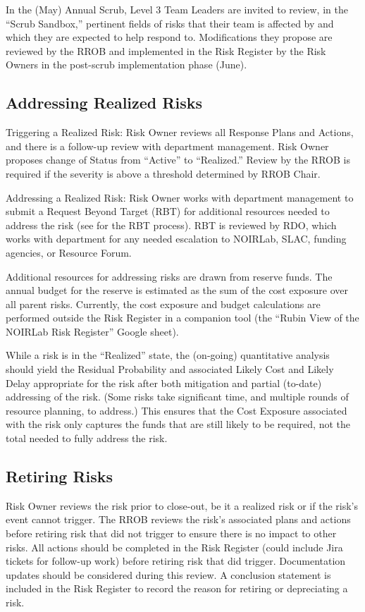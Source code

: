 In the (May) Annual Scrub, Level 3 Team Leaders are invited to review, in the ``Scrub Sandbox,'' pertinent fields of risks that their team is affected by and which they are expected to help respond to.
Modifications they propose are reviewed by the RROB and implemented in the Risk Register by the Risk Owners in the post-scrub implementation phase (June).

\subsection{Addressing Realized Risks}

Triggering a Realized Risk:
Risk Owner reviews all Response Plans and Actions, and there is a follow-up review with department management.
Risk Owner proposes change of Status from ``Active'' to ``Realized.''
Review by the RROB is required if the severity is above a threshold determined by RROB Chair.

Addressing a Realized Risk:
Risk Owner works with department management to submit a Request Beyond Target (RBT) for additional resources needed to address the risk (see  for the RBT process).
RBT is reviewed by RDO, which works with department for any needed escalation to NOIRLab, SLAC, funding agencies, or Resource Forum.

Additional resources for addressing risks are drawn from reserve funds.
The annual budget for the reserve is estimated as the sum of the cost exposure over all parent risks.
Currently, the cost exposure and budget calculations are performed outside the Risk Register in a companion tool (the ``Rubin View of the NOIRLab Risk Register'' Google sheet).

While a risk is in the ``Realized'' state, the (on-going) quantitative analysis should yield the Residual Probability and associated Likely Cost and Likely Delay appropriate for the risk after both mitigation and partial (to-date) addressing of the risk.
(Some risks take significant time, and multiple rounds of resource planning, to address.)
This ensures that the Cost Exposure associated with the risk only captures the funds that are still likely to be required, not the total needed to fully address the risk.

\subsection{Retiring Risks}

Risk Owner reviews the risk prior to close-out, be it a realized risk or if the risk's event cannot trigger.
The RROB reviews the risk's associated plans and actions before retiring risk that did not trigger to ensure there is no impact to other risks.
All actions should be completed in the Risk Register (could include Jira tickets for follow-up work) before retiring risk that did trigger.
Documentation updates should be considered during this review.
A conclusion statement is included in the Risk Register to record the reason for retiring or depreciating a risk.

